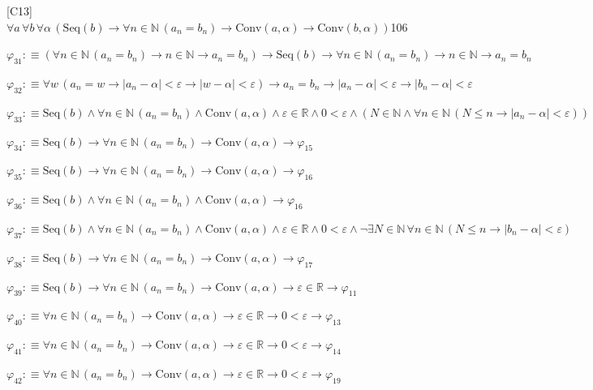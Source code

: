 \begin{fullproof}{[C13]}{$\forall a\,\forall b\,\forall \alpha\,(\mathrm{Seq}(b) \to \forall n \in \mathbb{N}\,(a_{n} = b_{n}) \to \mathrm{Conv}(a,\alpha) \to \mathrm{Conv}(b,\alpha))$}{106}
\begin{abbrevlist}
\item $\varphi_{31} :\equiv (\forall n \in \mathbb{N}\,(a_{n} = b_{n}) \to n \in \mathbb{N} \to a_{n} = b_{n}) \to \mathrm{Seq}(b) \to \forall n \in \mathbb{N}\,(a_{n} = b_{n}) \to n \in \mathbb{N} \to a_{n} = b_{n}$
\item $\varphi_{32} :\equiv \forall w\,(a_{n} = w \to \lvert a_{n} - \alpha \rvert < \varepsilon \to \lvert w - \alpha \rvert < \varepsilon) \to a_{n} = b_{n} \to \lvert a_{n} - \alpha \rvert < \varepsilon \to \lvert b_{n} - \alpha \rvert < \varepsilon$
\item $\varphi_{33} :\equiv \mathrm{Seq}(b) \land \forall n \in \mathbb{N}\,(a_{n} = b_{n}) \land \mathrm{Conv}(a,\alpha) \land \varepsilon \in \mathbb{R} \land 0 < \varepsilon \land (N \in \mathbb{N} \land \forall n \in \mathbb{N}\,(N \leq n \to \lvert a_{n} - \alpha \rvert < \varepsilon))$
\item $\varphi_{34} :\equiv \mathrm{Seq}(b) \to \forall n \in \mathbb{N}\,(a_{n} = b_{n}) \to \mathrm{Conv}(a,\alpha) \to \varphi_{15}$
\item $\varphi_{35} :\equiv \mathrm{Seq}(b) \to \forall n \in \mathbb{N}\,(a_{n} = b_{n}) \to \mathrm{Conv}(a,\alpha) \to \varphi_{16}$
\item $\varphi_{36} :\equiv \mathrm{Seq}(b) \land \forall n \in \mathbb{N}\,(a_{n} = b_{n}) \land \mathrm{Conv}(a,\alpha) \to \varphi_{16}$
\item $\varphi_{37} :\equiv \mathrm{Seq}(b) \land \forall n \in \mathbb{N}\,(a_{n} = b_{n}) \land \mathrm{Conv}(a,\alpha) \land \varepsilon \in \mathbb{R} \land 0 < \varepsilon \land \neg \exists N \in \mathbb{N}\,\forall n \in \mathbb{N}\,(N \leq n \to \lvert b_{n} - \alpha \rvert < \varepsilon)$
\item $\varphi_{38} :\equiv \mathrm{Seq}(b) \to \forall n \in \mathbb{N}\,(a_{n} = b_{n}) \to \mathrm{Conv}(a,\alpha) \to \varphi_{17}$
\item $\varphi_{39} :\equiv \mathrm{Seq}(b) \to \forall n \in \mathbb{N}\,(a_{n} = b_{n}) \to \mathrm{Conv}(a,\alpha) \to \varepsilon \in \mathbb{R} \to \varphi_{11}$
\item $\varphi_{40} :\equiv \forall n \in \mathbb{N}\,(a_{n} = b_{n}) \to \mathrm{Conv}(a,\alpha) \to \varepsilon \in \mathbb{R} \to 0 < \varepsilon \to \varphi_{13}$
\item $\varphi_{41} :\equiv \forall n \in \mathbb{N}\,(a_{n} = b_{n}) \to \mathrm{Conv}(a,\alpha) \to \varepsilon \in \mathbb{R} \to 0 < \varepsilon \to \varphi_{14}$
\item $\varphi_{42} :\equiv \forall n \in \mathbb{N}\,(a_{n} = b_{n}) \to \mathrm{Conv}(a,\alpha) \to \varepsilon \in \mathbb{R} \to 0 < \varepsilon \to \varphi_{19}$

\end{abbrevlist}
\end{fullproof}
